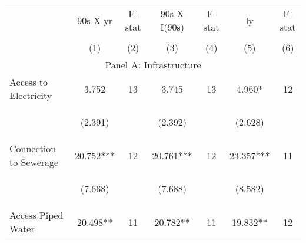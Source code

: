 \begin{tabular}{lcccccc}


\toprule


\multicolumn{1}{l}{} & \multicolumn{1}{c}{90s X yr} & \multicolumn{1}{c}{F-stat} & \multicolumn{1}{c}{90s X I(90s)} & \multicolumn{1}{c}{F-stat} & \multicolumn{1}{c}{ly} & \multicolumn{1}{c}{F-stat}  \\

\cmidrule(l{1mm}r{1mm}){2-3} \cmidrule(l{1mm}r{1mm}){4-5} \cmidrule(l{1mm}r{1mm}){6-7}   \\

 & (1) & (2) & (3) & (4) & (5) & (6)  \\ 
 

\hline

\multicolumn{7}{c}{Panel A: Infrastructure}   \\                                                          

Access to Electricity   	&  3.752   
				&  13  
				&   3.745  
				&  13 
				&  4.960*  
				&  12 \\

\vspace{4pt} &  \begin{footnotesize}(2.391)\end{footnotesize}   & &
			    \begin{footnotesize}(2.392)\end{footnotesize}   & &
			    \begin{footnotesize}(2.628)\end{footnotesize}   & \\          


Connection to Sewerage   &  20.752***   &  12  &   20.761***  &  12 &  23.357***  &  11   \\

\vspace{4pt} &  \begin{footnotesize}(7.668)\end{footnotesize}   & &
			    \begin{footnotesize}(7.688)\end{footnotesize}   & &
			    \begin{footnotesize}(8.582)\end{footnotesize}   &
			     \\          


Access Piped Water   &  20.498**   &  11  &   20.782**  &  11 &  19.832**  &  12   \\



\end{tabular}
